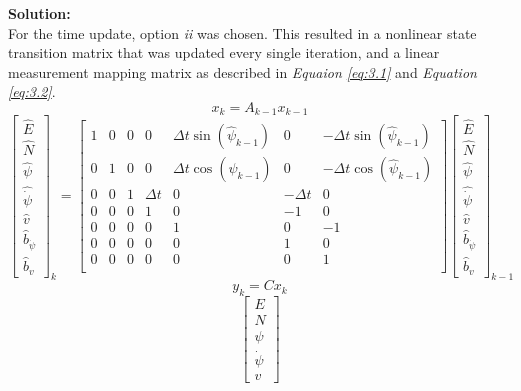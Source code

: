 \documentclass[10pt]{article}
\newcommand{\solution}{\textbf{Solution: \\}}
\begin{document}
\begin{enumerate}[label=\textbf{\arabic*.}]
  \solution
  For the time update, option \emph{ii} was chosen. This resulted in a nonlinear 
  state transition matrix that was updated every single iteration, and a linear 
  measurement mapping matrix as described in \emph{Equaion \ref{eq:3.1}} and 
  \emph{Equation \ref{eq:3.2}}.
  \begin{equation*}
    x_{k} = A_{k-1} x_{k-1}
  \end{equation*}
  \begin{equation}
    \begin{bmatrix} 
      \hat{E} \\ \hat{N} \\ \hat{\psi} \\ \hat{\dot{\psi}} \\ \hat{v} \\ \hat{b}_{\dot{\psi}} \\  \hat{b}_{v} 
    \end{bmatrix}_{k}
    = 
    \begin{bmatrix}
      1 & 0 & 0 & 0 & \Delta t \sin{(\hat{\psi}_{k-1})} & 0 & -\Delta t \sin{(\hat{\psi}_{k-1})} \\
      0 & 1 & 0 & 0 & \Delta t \cos{(\hat{\psi}_{k-1})} & 0 & -\Delta t \cos{(\hat{\psi}_{k-1})} \\
      0 & 0 & 1 & \Delta t & 0 & -\Delta t & 0 \\
      0 & 0 & 0 & 1 & 0 & -1 & 0 \\
      0 & 0 & 0 & 0 & 1 & 0 & -1 \\
      0 & 0 & 0 & 0 & 0 & 1 & 0 \\
      0 & 0 & 0 & 0 & 0 & 0 & 1 \\
    \end{bmatrix}
    \begin{bmatrix}
      \hat{E} \\ \hat{N} \\ \hat{\psi} \\ \hat{\dot{\psi}} \\ \hat{v} \\ \hat{b}_{\dot{\psi}} \\  \hat{b}_{v}
    \end{bmatrix}_{k-1}
    \label{eq:3.1}
  \end{equation}
  \begin{equation*}
    y_{k} = C x_{k}
  \end{equation*}
  \begin{equation}
    \begin{bmatrix} 
      E \\ N \\ \psi \\ \dot{\psi} \\ v 

\end{bmatrix}
\end{equation}
\end{enumerate}
\end{document}
